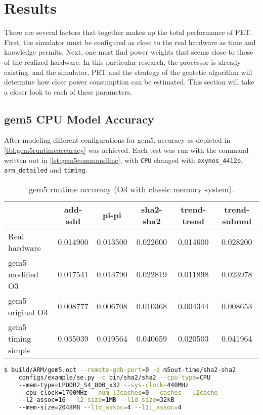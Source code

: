 \section{Results}



There are several factors that together makes up the total performance of PET. First, the simulator must be
configured as close to the real hardware as time and knowledge permits. Next, one must find power weights that
seems close to those of the realized hardware. In this particular research, the processor is already existing,
and the simulator, PET and the strategy of the gentetic algorithm will determine how close power consumption
can be estimated. This section will take a closer look to each of these parameters.

\subsection{gem5 CPU Model Accuracy}

After modeling different configurations for gem5, accuracy as depicted in \autoref{tbl:gem5runtimeaccuracy}
was achieved. Each test was run with the command written out in \autoref{lst:gem5commandline}, with \texttt{CPU}
changed with  \texttt{exynos\_4412p}, \texttt{arm\_detailed} and \texttt{timing}.

\begin{table}
\centering
\begin{tabular}{|l|c|c|c|c|c|}
\hline
   & add-add & pi-pi & sha2-sha2 & trend-trend & trend-submul\\
\hline
Real hardware & 0.014900  & 0.013500 & 0.022600 & 0.014600 & 0.028200\\
gem5 modified O3    & 0.017541 & 0.013790 & 0.022819 & 0.011898 & 0.023978 \\
gem5 original O3    & 0.008777 & 0.006708 & 0.010368 & 0.004344 & 0.008653\\
gem5 timing simple  & 0.035039 & 0.019564 & 0.040659 & 0.020503 & 0.041964 \\
\hline
\end{tabular}
\caption{gem5 runtime accuracy (O3 with classic memory system).}
\label{tbl:gem5runtimeaccuracy}
\end{table}

\begin{lstlisting}[float=htb,language=sh,numbers=none,label={lst:gem5commandline},caption={gem5 Command Line.}]
$ build/ARM/gem5.opt --remote-gdb-port=0 -d m5out-time/sha2-sha2
    configs/example/se.py -c bin/sha2/sha2 --cpu-type=CPU
    --mem-type=LPDDR2_S4_800_x32 --sys-clock=440MHz
    --cpu-clock=1700MHz --num-l3caches=0 --caches --l2cache
    --l2_assoc=16 --l2_size=1MB --l1d_size=32kB
    --mem-size=2048MB --l1d_assoc=4 --l1i_assoc=4
\end{lstlisting}

